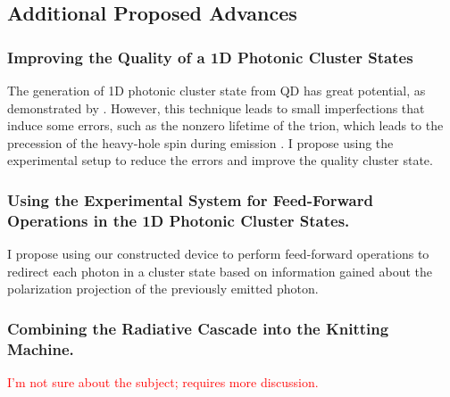\subsection{Additional Proposed Advances}
\subsubsection{Improving the Quality of a 1D Photonic Cluster States}
The generation of 1D photonic cluster state from QD has great potential, as demonstrated by \cite{Cogan2023}. However, this technique leads to small imperfections that induce some errors, such as the nonzero lifetime of the trion, which leads to the precession of the heavy-hole spin during emission \cite{Linder2009}. I propose using the experimental setup to reduce the errors and improve the quality cluster state. 
\subsubsection{Using the Experimental System for Feed-Forward Operations in the 1D  Photonic Cluster States.}
I propose using our constructed device to perform feed-forward operations to redirect each photon in a cluster state based on information gained about the polarization projection of the previously emitted photon. 
\subsubsection{Combining the Radiative Cascade into the Knitting Machine.}
\textcolor{red} {I'm not sure about the subject; requires more discussion. }